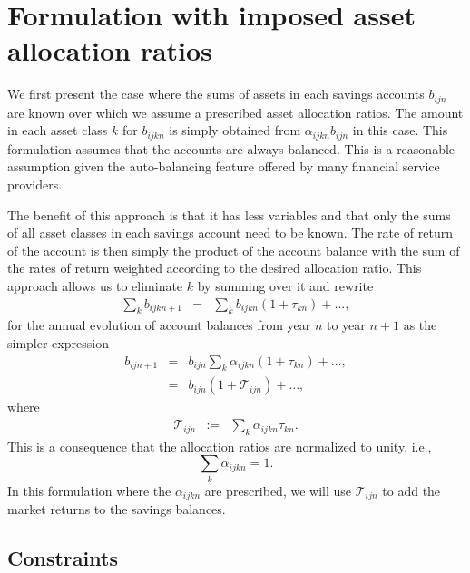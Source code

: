 \documentclass{report}[fleqn,12pt]
\begin{document}
\begin{description}[leftmargin=4em,style=multiline]
\end{description}

\chapter{Formulation with imposed asset allocation ratios}
We first present the case where the sums of assets in each savings accounts $b_{ijn}$ are known
over which we assume a prescribed asset allocation ratios.
The amount in each asset class $k$ for $b_{ijkn}$ is simply obtained
from $\alpha_{ijkn} b_{ijn}$ in this case.
This formulation assumes that the accounts are always balanced. This is
a reasonable assumption given the auto-balancing feature offered by many financial service
providers.

The benefit of this approach is that it has less variables and that only the sums of
all asset classes in each savings account need to be known. The rate of return
of the account is then simply the product of the account balance with the sum of
the rates of return weighted according to the desired allocation ratio.
This approach allows us to eliminate $k$ by summing over it and rewrite
\begin{eqnarray}
	\sum_k b_{ijkn+1} &=& \sum_k b_{ijkn} (1 + \tau_{kn}) + \ldots ,
\end{eqnarray}
for the annual evolution of account balances from year $n$ to year $n+1$
as the simpler expression 
\begin{eqnarray}
	b_{ijn+1} &=& b_{ijn} \sum_k \alpha_{ijkn} (1 + \tau_{kn}) + \ldots ,\nonumber \\
		  &=& b_{ijn} (1 + \mathcal{T}_{ijn}) + \ldots ,
\end{eqnarray}
where
\begin{eqnarray}
	\label{Eq:Tau1}
	\mathcal{T}_{ijn} &:=& \sum_k \alpha_{ijkn} \tau_{kn}.
\end{eqnarray}
This is a consequence that the allocation ratios are normalized to unity, i.e.,
\begin{equation}
	\sum_k \alpha_{ijkn} = 1.
\end{equation}
In this formulation where the $\alpha_{ijkn}$ are prescribed,
we will use $\mathcal{T}_{ijn}$ to
add the market returns to the savings balances.

\section{Constraints}
\end{document}
